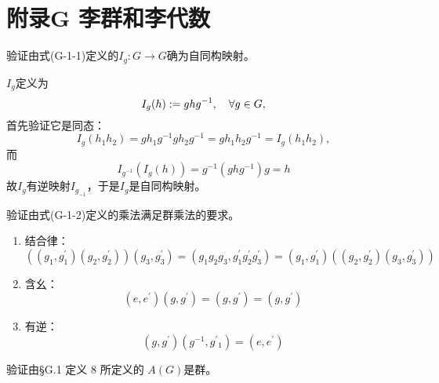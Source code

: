 \chapter*{附录G \quad 李群和李代数}
\setcounter{xiti}{0}
\begin{xiti}
	\item 验证由式(G-1-1)定义的$I_g \colon G\rightarrow G$确为自同构映射。
	
	\begin{zm}
		$I_g $定义为
		\[I_g(h) := g h g^{-1}\qc \forall g\in G, \]
		首先验证它是同态：
		\begin{displaymath}
		I_g (h_1 h_2) = g h_1 g^{-1} g h_2 g^{-1}= g h_1 h_2 g^{-1} = I_g (h_1 h_2),
		\end{displaymath}
		而
		\begin{displaymath}
		I_{g^{-1}} (I_g (h) )= g^{-1} \left( g h g^{-1} \right) g=h
		\end{displaymath}
		故$I_g $有逆映射$I_{g_{-1}} $，于是$I_g $是自同构映射。
	\end{zm}
	
	\item 验证由式(G-1-2)定义的乘法满足群乘法的要求。
	
	\begin{zm}
		\begin{enumerate}
			\item 结合律：
			\begin{displaymath}
			\left( \left(g_1,g^\prime_1\right) \left(g_2,g^\prime_2\right) \right) \left(g_3,g^\prime_3\right) = \left( g_1 g_2 g_3 , g^\prime_1 g^\prime_2 g^\prime_3 \right)= \left( g_1,g^\prime_1 \right) \left( \left( g_2,g^\prime_2 \right) \left( g_3,g^\prime_3 \right) \right) 
			\end{displaymath}
			\item 含幺：
			\begin{displaymath}
			\left( e,e^\prime \right) \left( g,g^\prime \right) = \left( g,g^\prime \right) = \left( g,g^\prime \right)
			\end{displaymath}
			\item 有逆：
			\begin{displaymath}
			\left( g,g^\prime \right) \left( g^{-1}, {g^\prime}{_1} \right)= \left( e,e^\prime \right)
			\end{displaymath}
		\end{enumerate}
	\end{zm}

    \item 验证由\S G.1 定义 8 所定义的 $A(G) $是群。
    

\end{xiti}
